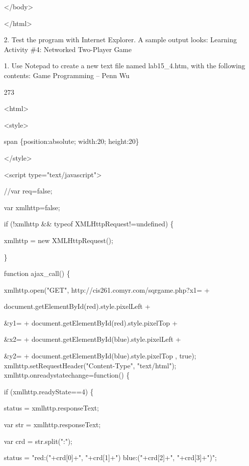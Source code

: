 \documentclass[
]{article}
\begin{document}
\textless/body\textgreater{}

\textless/html\textgreater{}

2. Test the program with Internet Explorer. A sample output looks:
Learning Activity \#4: Networked Two-Player Game

1. Use Notepad to create a new text file named lab15\_4.htm, with the
following contents: Game Programming -- Penn Wu

273

\protect\hypertarget{index_split_014.htmlux5cux23p274}{}{}

\textless html\textgreater{}

\textless style\textgreater{}

span \{position:absolute; width:20; height:20\}

\textless/style\textgreater{}

\textless script type="text/javascript"\textgreater{}

//var req=false;

var xmlhttp=false;

if (!xmlhttp \&\& typeof
XMLHttpRequest!=\textquotesingle undefined\textquotesingle) \{

xmlhttp = new XMLHttpRequest();

\}

function ajax\_call() \{

xmlhttp.open("GET",
\textquotesingle http://cis261.comyr.com/sqrgame.php?x1=\textquotesingle{}
+

document.getElementById(\textquotesingle red\textquotesingle).style.pixelLeft
+

\textquotesingle\&y1=\textquotesingle{} +
document.getElementById(\textquotesingle red\textquotesingle).style.pixelTop
+

\textquotesingle\&x2=\textquotesingle{} +
document.getElementById(\textquotesingle blue\textquotesingle).style.pixelLeft
+

\textquotesingle\&y2=\textquotesingle{} +
document.getElementById(\textquotesingle blue\textquotesingle).style.pixelTop
, true); xmlhttp.setRequestHeader("Content-Type", "text/html");
xmlhttp.onreadystatechange=function() \{

if (xmlhttp.readyState==4) \{

status = xmlhttp.responseText;

var str = xmlhttp.responseText;

var crd = str.split(":");

status = "red:("+crd{[}0{]}+", "+crd{[}1{]}+") blue:("+crd{[}2{]}+",
"+crd{[}3{]}+")";
\end{document}
